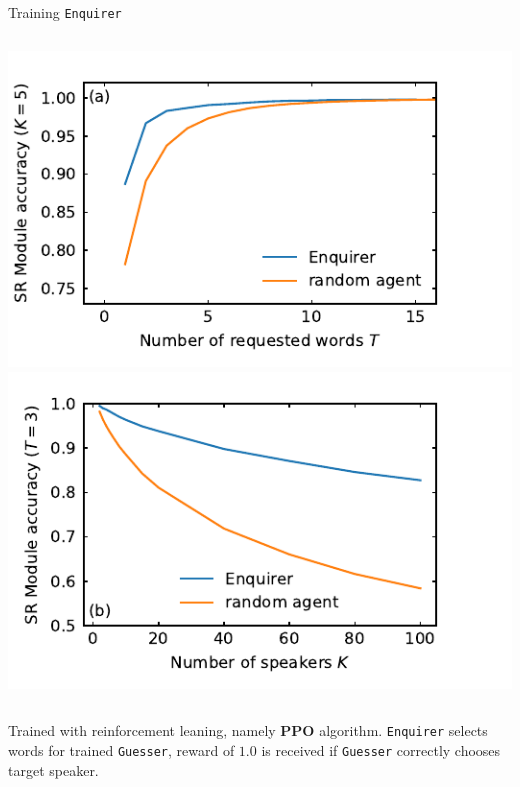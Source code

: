 \documentclass[11pt, aspectratio=169]{beamer}
\newcommand{\guesser}{\texttt{Guesser}}
\newcommand{\enquirer}{\texttt{Enquirer}}
\newcommand{\vimgscale}{0.8}
\begin{document}
\begin{frame}[t]{Training \enquirer{}}
    \begin{columns}
        \centering
        \includegraphics[scale=\vimgscale]{../plots/word_sweep_enq.pdf}
        \includegraphics[scale=\vimgscale]{../plots/guest_sweep_enq.pdf}
    \end{columns}

    Trained with reinforcement leaning, namely \textbf{PPO} algorithm.
    \enquirer{} selects words for trained \guesser{}, reward of $1.0$ is received
    if \guesser{} correctly chooses target speaker.
\end{frame}
\end{document}
